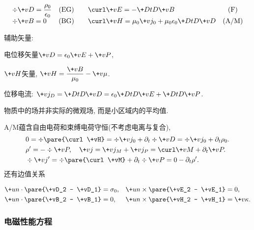 \documentclass[hidelinks]{ctexart}
\begin{document}
\vspace{-\baselineskip}
\[ \displaystyle \begin{array}{lcclc}
    \displaystyle \div \+vD = \frac{\rho_0}{\epsilon_0} & \text{(EG)} &&\displaystyle  \curl \+vE = -\+DtD{\+vB} & \text{(F)} \\
    \displaystyle \div \+vB = 0 & \text{(BG)} &&\displaystyle  \curl \+vH = \mu_0 \+vj_0 + \mu_0\epsilon_0 \+DtD{\+vD} & \text{(A/M)}
\end{array} \]
\begin{cenum}
    \item 辅助矢量:
    \begin{cenum}
        \item 电位移矢量$\+vD = \epsilon_0 \+vE + \+vP$,
        \item $\+vH$矢量, $\displaystyle \+vH = \frac{\+vB}{\mu_0} - \+v\mu$.
    \end{cenum}
    \item 位移电流: $\displaystyle \+vj_D = \+DtD{\+vD} = \epsilon_0 \+DtD{\+vE} + \+DtD{\+vP}$.
\end{cenum}
物质中的场并非实际的微观场, 而是小区域内的平均值.
\par
A/M蕴含自由电荷和束缚电荷守恒(不考虑电离与复合),
\begin{align*}
    &0 = \div\pare{\curl \+vH} = \div \+vj_0 + \partial_t \div \+vD = \div \+vj_0 + \partial_t \rho_0. \\
    &\rho' = -\div \+vP,\quad \+vj = \+vj_M + \+vj_P = \curl \+vM + \partial_t \+vP. \\
    &\div \+vj' = \div\pare{\curl \+vM} + \partial_t \div \+vP = 0 - \partial_t \rho'.
\end{align*}
还有边值关系
\begin{resume}
    \[ \begin{aligned}
        &\+un \cdot \pare{\+vD_2 - \+vD_1} = \sigma_0, && \+un\times\pare{\+vE_2 - \+vE_1} = 0, \\
        &\+un \cdot \pare{\+vB_2 - \+vB_1} = 0,&& \+un\times\pare{\+vH_2 - \+vH_1} = \+v\kappa.
    \end{aligned} \]
\end{resume}


\subsubsection{电磁性能方程} %
\label{ssub:电磁性能方程}
\end{document}
